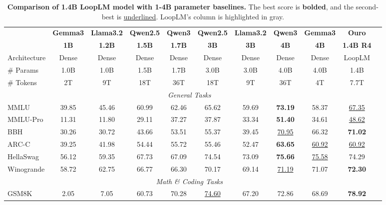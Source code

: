 \documentclass[]{bytedance_seed}
\newcommand{\1}{\mathbf{1}}
\newcommand{\ut}{LoopLM}
\begin{document}
\begin{table}[htbp]
\centering
\caption{\textbf{Comparison of 1.4B  \ut{} model with 1-4B parameter baselines.} The best score is \textbf{bolded}, and the second-best is \underline{underlined}. \ut{}'s column is highlighted in gray.}
\label{tab:base-1.4B}
\small
\setlength{\tabcolsep}{2.5pt}
\begin{tabular}{@{}lcccccccccc@{}}
\toprule
 & \textbf{Gemma3} & \textbf{Llama3.2} & \textbf{Qwen2.5} & \textbf{Qwen3} & \textbf{Qwen2.5} & \textbf{Llama3.2} & \textbf{Qwen3} & \textbf{Gemma3} & \cellcolor{lightergray}\textbf{Ouro} \\
 & \textbf{1B} & \textbf{1.2B} & \textbf{1.5B} & \textbf{1.7B} & \textbf{3B} & \textbf{3B} & \textbf{4B} & \textbf{4B} & \cellcolor{lightergray}\textbf{1.4B R4} \\
\midrule
Architecture & Dense & Dense & Dense & Dense & Dense & Dense & Dense & Dense & \cellcolor{lightergray}\ut{}\\
\# Params & 1.0B & 1.0B & 1.5B & 1.7B & 3.0B & 3.0B & 4.0B & 4.0B & \cellcolor{lightergray}1.4B\\
\# Tokens & 2T & 9T & 18T & 36T & 18T & 9T & 36T & 4T & \cellcolor{lightergray}7.7T\\
\midrule
\multicolumn{10}{c}{\textit{General Tasks}} \\
\midrule
MMLU & 39.85 & 45.46 & 60.99 & 62.46 & 65.62 & 59.69 & \textbf{73.19} & 58.37 & \cellcolor{lightergray}\underline{67.35} \\
MMLU-Pro & 11.31 & 11.80 & 29.11 & 37.27 & 37.87 & 33.34 & \textbf{51.40} & 34.61 & \cellcolor{lightergray}\underline{48.62} \\
BBH & 30.26 & 30.72 & 43.66 & 53.51 & 55.37 & 39.45 & \underline{70.95} & 66.32 & \cellcolor{lightergray}\textbf{71.02} \\
ARC-C & 39.25 & 41.98 & 54.44 & 55.72 & 55.46 & 52.47 & \textbf{63.65} & \underline{60.92} & \cellcolor{lightergray}\underline{60.92} \\
HellaSwag & 56.12 & 59.35 & 67.73 & 67.09 & 74.54 & 73.09 & \textbf{75.66} & \underline{75.58} & \cellcolor{lightergray}74.29 \\
Winogrande & 58.72 & 62.75 & 66.77 & 66.30 & 70.17 & 69.14 & \underline{71.19} & 71.07 & \cellcolor{lightergray}\textbf{72.30} \\
\midrule
\multicolumn{10}{c}{\textit{Math \& Coding Tasks}} \\
\midrule
GSM8K & 2.05 & 7.05 & 60.73 & 70.28 & \underline{74.60} & 67.20 & 72.86 & 68.69 & \cellcolor{lightergray}\textbf{78.92} \\

\end{tabular}
\end{table}
\end{document}
